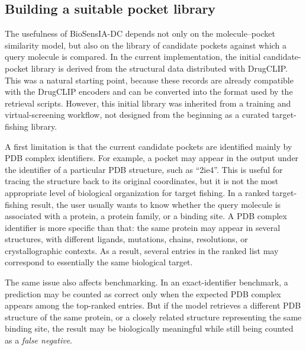 \documentclass[12pt,fleqn]{article}
\begin{document}
\subsection{Building a suitable pocket library}
\label{sec:building-pocket-library}

The usefulness of BioSensIA-DC depends not only on the
molecule--pocket similarity model, but also on the library of
candidate pockets against which a query molecule is compared. In the
current implementation, the initial candidate-pocket library is
derived from the structural data distributed with DrugCLIP. This was a
natural starting point, because these records are already compatible
with the DrugCLIP encoders and can be converted into the format used
by the retrieval scripts. However, this initial library was inherited
from a training and virtual-screening workflow, not designed from the
beginning as a curated target-fishing library.

A first limitation is that the current candidate pockets are
identified mainly by PDB complex identifiers. For example, a pocket
may appear in the output under the identifier of a particular PDB
structure, such as ``2ie4''. This is useful for tracing the structure
back to its original coordinates, but it is not the most appropriate
level of biological organization for target fishing. In a ranked
target-fishing result, the user usually wants to know whether the
query molecule is associated with a protein, a protein family, or a
binding site. A PDB complex identifier is more specific than that: the
same protein may appear in several structures, with different ligands,
mutations, chains, resolutions, or crystallographic contexts. As a
result, several entries in the ranked list may correspond to
essentially the same biological target.


The same issue also affects benchmarking. In an exact-identifier
benchmark, a prediction may be counted as correct only when the
expected PDB complex appears among the top-ranked entries. But if the
model retrieves a different PDB structure of the same protein, or a
closely related structure representing the same binding site, the
result may be biologically meaningful while still being counted as a
\emph{false negative}.
\end{document}
